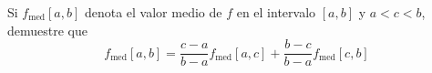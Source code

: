\item Si $f_{\text{med}}[a, b]$ denota el valor medio de $f$ en el intervalo $[a, b]$ y $a < c < b$, demuestre que
$$f_{\text{med}}[a, b] = \frac{c - a}{b - a} f_{\text{med}}[a, c] + \frac{b - c}{b - a} f_{\text{med}}[c, b]$$

